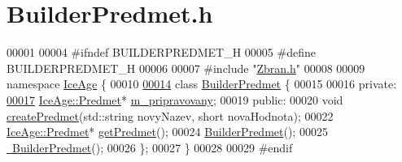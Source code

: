 \hypertarget{BuilderPredmet_8h_source}{}\section{Builder\+Predmet.\+h}
\label{BuilderPredmet_8h_source}

\begin{DoxyCode}
00001 
00004 \textcolor{preprocessor}{#ifndef BUILDERPREDMET\_H}
00005 \textcolor{preprocessor}{#define BUILDERPREDMET\_H}
00006 
00007 \textcolor{preprocessor}{#include "\hyperlink{Zbran_8h}{Zbran.h}"}
00008 
00009 \textcolor{keyword}{namespace }\hyperlink{namespaceIceAge}{IceAge} \{
00010 
\hypertarget{BuilderPredmet_8h_source.tex_l00014}{}\hyperlink{classIceAge_1_1BuilderPredmet}{00014}     \textcolor{keyword}{class }\hyperlink{classIceAge_1_1BuilderPredmet}{BuilderPredmet} \{
00015 
00016     \textcolor{keyword}{private}:
\hypertarget{BuilderPredmet_8h_source.tex_l00017}{}\hyperlink{classIceAge_1_1BuilderPredmet_ab51158b23493b9c1bb891f8be4a69b5d}{00017}         \hyperlink{classIceAge_1_1Predmet}{IceAge::Predmet}* \hyperlink{classIceAge_1_1BuilderPredmet_ab51158b23493b9c1bb891f8be4a69b5d}{m\_pripravovany};
00019     \textcolor{keyword}{public}:
00020         \textcolor{keywordtype}{void} \hyperlink{classIceAge_1_1BuilderPredmet_a4fcdb35cc3edcec69386f4a68ff95d28}{createPredmet}(std::string novyNazev, \textcolor{keywordtype}{short} novaHodnota);
00022         \hyperlink{classIceAge_1_1Predmet}{IceAge::Predmet}* \hyperlink{classIceAge_1_1BuilderPredmet_ab84508589d73e202dd4002d6b23ad22e}{getPredmet}();
00024         \hyperlink{classIceAge_1_1BuilderPredmet_ab13db2f68a2c79a59e093fcb8d517f04}{BuilderPredmet}();
00025         \hyperlink{classIceAge_1_1BuilderPredmet_a4fdc3033e390d15dc12c540b2b6c6456}{~BuilderPredmet}();
00026     \};
00027 \}
00028 
00029 \textcolor{preprocessor}{#endif}
\end{DoxyCode}
